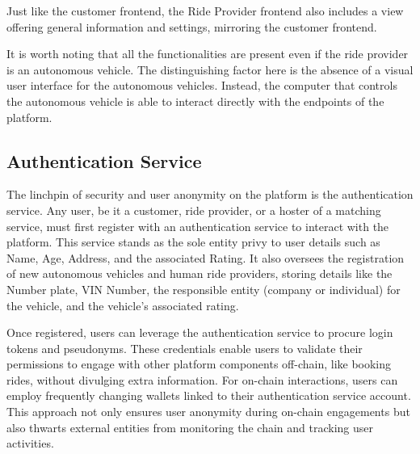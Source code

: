 Just like the customer frontend, the Ride Provider frontend also includes a view offering general information and settings, mirroring the customer frontend.

It is worth noting that all the functionalities are present even if the ride provider is an autonomous vehicle. The distinguishing factor here is the absence of a visual user interface for the autonomous vehicles. Instead, the computer that controls the autonomous vehicle is able to interact directly with the endpoints of the platform.

\subsection{Authentication Service}

The linchpin of security and user anonymity on the platform is the authentication service. Any user, be it a customer, ride provider, or a hoster of a matching service, must first register with an authentication service to interact with the platform. This service stands as the sole entity privy to user details such as Name, Age, Address, and the associated Rating. It also oversees the registration of new autonomous vehicles and human ride providers, storing details like the Number plate, VIN Number, the responsible entity (company or individual) for the vehicle, and the vehicle's associated rating.

Once registered, users can leverage the authentication service to procure login tokens and pseudonyms. These credentials enable users to validate their permissions to engage with other platform components off-chain, like booking rides, without divulging extra information. For on-chain interactions, users can employ frequently changing wallets linked to their authentication service account. This approach not only ensures user anonymity during on-chain engagements but also thwarts external entities from monitoring the chain and tracking user activities.

